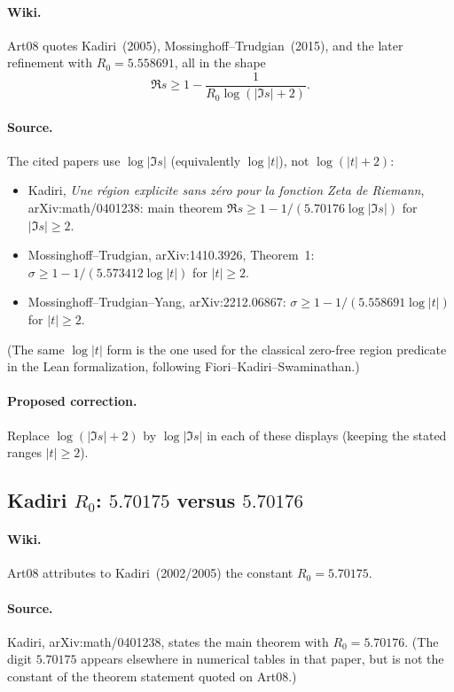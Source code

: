 \documentclass[11pt,a4paper]{article}
\begin{document}
\paragraph{Wiki.}
Art08 quotes Kadiri~(2005), Mossinghoff--Trudgian~(2015), and the later
refinement with $R_0=5.558691$, all in the shape
\[
\Re s\ge 1-\frac1{R_0\log(|\Im s|+2)}.
\]
\paragraph{Source.}
The cited papers use $\log|\Im s|$ (equivalently $\log|t|$), not
$\log(|t|+2)$:
\begin{itemize}[leftmargin=*]
\item Kadiri, \emph{Une r\'egion explicite sans z\'ero pour la fonction
  Zeta de Riemann}, arXiv:math/0401238: main theorem
  $\Re s\ge 1-1/(5.70176\log|\Im s|)$ for $|\Im s|\ge 2$.
\item Mossinghoff--Trudgian, arXiv:1410.3926, Theorem~1:
  $\sigma\ge 1-1/(5.573412\log|t|)$ for $|t|\ge 2$.
\item Mossinghoff--Trudgian--Yang, arXiv:2212.06867:
  $\sigma\ge 1-1/(5.558691\log|t|)$ for $|t|\ge 2$.
\end{itemize}
(The same $\log|t|$ form is the one used for the classical zero-free
region predicate in the Lean formalization, following Fiori--Kadiri--Swaminathan.)
\paragraph{Proposed correction.}
Replace $\log(|\Im s|+2)$ by $\log|\Im s|$ in each of these displays
(keeping the stated ranges $|t|\ge 2$).

\subsection{Kadiri $R_0$: $5.70175$ versus $5.70176$}
\label{err:art08-kadiri-r0}
\paragraph{Wiki.}
Art08 attributes to Kadiri~(2002/2005) the constant $R_0=5.70175$.
\paragraph{Source.}
Kadiri, arXiv:math/0401238, states the main theorem with
$R_0=\mathbf{5.70176}$.  (The digit $5.70175$ appears elsewhere in
numerical tables in that paper, but is not the constant of the theorem
statement quoted on Art08.)
\end{document}
